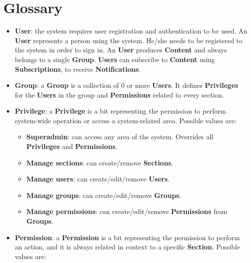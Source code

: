 \documentclass[12pt]{report}
\renewcommand\emph{\textbf}
\begin{document}
            \section{Glossary}

                \begin{itemize}
                    \item \emph{User}: the system requires user registration and authentication to be used. An \emph{User} represents a person using the system. He/she needs to be registered to the system in order to sign in. An \emph{User} produces \emph{Content} and always belongs to a single \emph{Group}. \emph{Users} can subscribe to \emph{Content} using \emph{Subscriptions}, to receive \emph{Notifications}.
                    \item \emph{Group}: a \emph{Group} is a collection of 0 or more \emph{Users}. It defines \emph{Privileges} for the \emph{Users} in the group and \emph{Permissions} related to every section.
                    \item \emph{Privilege}: a \emph{Privilege} is a bit representing the permission to perform system-wide operation or access a system-related area. Possible values are: 

                        \begin{itemize}
                            \item \emph{Superadmin}: can access any area of the system. Overrides all \emph{Privileges} and \emph{Permissions}.
                            \item \emph{Manage sections}: can create/remove \emph{Sections}.
                            \item \emph{Manage users}: can create/edit/remove \emph{Users}.
                            \item \emph{Manage groups}: can create/edit/remove \emph{Groups}.
                            \item \emph{Manage permissions}: can create/edit/remove \emph{Permissions} from \emph{Groups}.
                        \end{itemize}

                    \item \emph{Permission}: a \emph{Permission} is a bit representing the permission to perform an action, and it is always related in context to a specific \emph{Section}. Possible values are:


\end{itemize}
\end{document}
